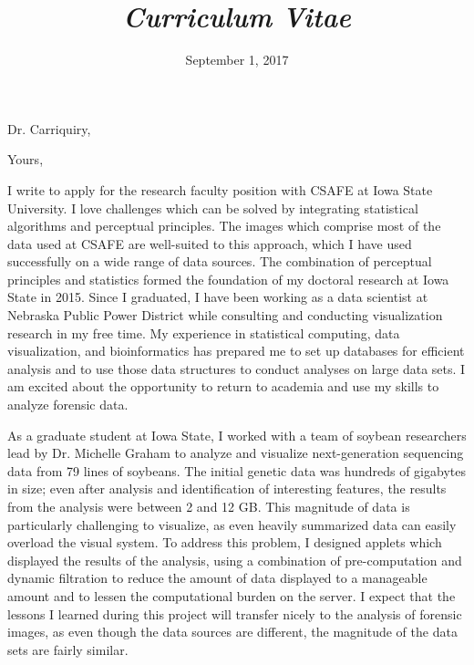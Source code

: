 \documentclass[12pt, letterpaper, sans]{moderncv}
\title{\emph{Curriculum Vitae}}
\begin{document}
\date{September 1, 2017}
\opening{Dr. Carriquiry,}
\closing{Yours,}
\makelettertitle

I write to apply for the research faculty position with CSAFE at Iowa State University. I love challenges which can be solved by integrating statistical algorithms and perceptual principles. The images which comprise most of the data used at CSAFE are well-suited to this approach, which I have used successfully on a wide range of data sources. The combination of perceptual principles and statistics formed the foundation of my doctoral research at Iowa State in 2015. Since I graduated, I have been working as a data scientist at Nebraska Public Power District while consulting and conducting visualization research in my free time. My experience in statistical computing, data visualization, and bioinformatics has prepared me to set up databases for efficient analysis and to use those data structures to conduct analyses on large data sets. I am excited about the opportunity to return to academia and use my skills to analyze forensic data. 

As a graduate student at Iowa State, I worked with a team of soybean researchers lead by Dr. Michelle Graham to analyze and visualize next-generation sequencing data from 79 lines of soybeans. The initial genetic data was hundreds of gigabytes in size; even after analysis and identification of interesting features, the results from the analysis were between 2 and 12 GB. This magnitude of data is particularly challenging to visualize, as even heavily summarized data can easily overload the visual system. To address this problem, I designed applets which displayed the results of the analysis, using a combination of pre-computation and dynamic filtration to reduce the amount of data displayed to a manageable amount and to lessen the computational burden on the server. I expect that the lessons I learned during this project will transfer nicely to the analysis of forensic images, as even though the data sources are different, the magnitude of the data sets are fairly similar. 
\end{document}

